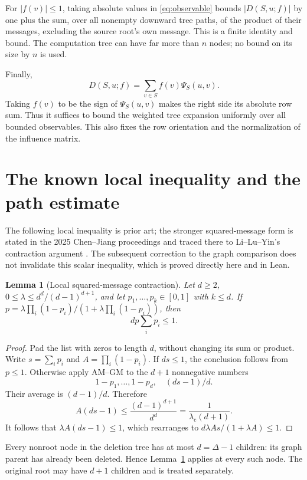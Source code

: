 \documentclass[11pt]{article}
\newtheorem{lemma}[theorem]{Lemma}
\theoremstyle{definition}
\newcommand{\lamc}{\lambda_{\mathrm c}}
\begin{document}
For $|f(v)|\le1$, taking absolute values in \eqref{eq:observable} bounds
$|D(S,u;f)|$ by one plus the sum, over all nonempty downward tree paths,
of the product of their messages, excluding the source root's own message.
This is a finite identity and bound. The computation tree can have far more
than $n$ nodes; no bound on its size by $n$ is used.

Finally,
\begin{equation}\label{eq:duality}
 D(S,u;f)=\sum_{v\in S}f(v)\Psi_S(u,v).
\end{equation}
Taking $f(v)$ to be the sign of $\Psi_S(u,v)$ makes the right side its
absolute row sum. Thus it suffices to bound the weighted tree expansion
uniformly over all bounded observables. This also fixes the row orientation
and the normalization of the influence matrix.

\section{The known local inequality and the path estimate}

The following local inequality is prior art; the stronger squared-message
form is stated in the 2025 Chen--Jiang proceedings and traced there to
Li--Lu--Yin's contraction argument \cite{CJ25,LLY}. The subsequent correction
to the graph comparison does not invalidate this scalar inequality, which
is proved directly here and in Lean.

\begin{lemma}[Local squared-message contraction]\label{lem:local}
Let $d\ge2$, $0\le\lambda\le d^d/(d-1)^{d+1}$, and let
$p_1,\ldots,p_k\in[0,1]$ with $k\le d$. If
$p=\lambda\prod_i(1-p_i)/(1+\lambda\prod_i(1-p_i))$, then
\[
 d p\sum_i p_i\le1.
\]
\end{lemma}
\begin{proof}
Pad the list with zeros to length $d$, without changing its sum or product.
Write $s=\sum_i p_i$ and $A=\prod_i(1-p_i)$. If $ds\le1$, the conclusion
follows from $p\le1$. Otherwise apply AM--GM to the $d+1$ nonnegative
numbers
\[
 1-p_1,\ldots,1-p_d,\quad (ds-1)/d.
\]
Their average is $(d-1)/d$. Therefore
\[
 A(ds-1)\le\frac{(d-1)^{d+1}}{d^d}=\frac1{\lamc(d+1)}.
\]
It follows that $\lambda A(ds-1)\le1$, which rearranges to
$d\lambda As/(1+\lambda A)\le1$.
\end{proof}

Every nonroot node in the deletion tree has at most $d=\Delta-1$ children:
its graph parent has already been deleted. Hence Lemma~\ref{lem:local}
applies at every such node. The original root may have $d+1$ children and
is treated separately.
\end{document}
